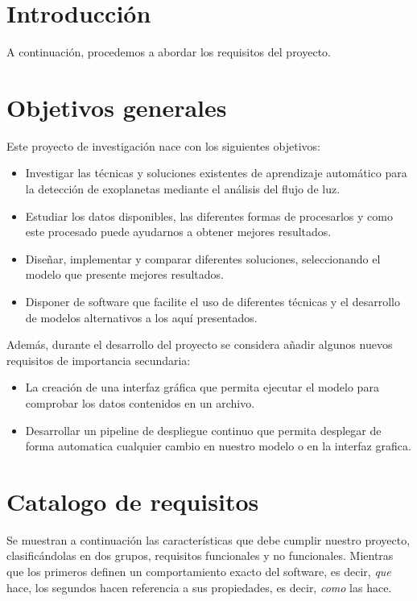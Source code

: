 
\section{Introducción}

A continuación, procedemos a abordar los requisitos del proyecto.

\section{Objetivos generales}

Este proyecto de investigación nace con los siguientes objetivos:

\begin{itemize}
    \item Investigar las técnicas y soluciones existentes de aprendizaje automático para la detección de exoplanetas mediante el análisis del flujo de luz.    
    \item Estudiar los datos disponibles, las diferentes formas de procesarlos y como este procesado puede ayudarnos a obtener mejores resultados.
    \item Diseñar, implementar y comparar diferentes soluciones, seleccionando el modelo que presente mejores resultados.
    \item Disponer de software que facilite el uso de diferentes técnicas y el desarrollo de modelos alternativos a los aquí presentados.
\end{itemize}

Además, durante el desarrollo del proyecto se considera añadir algunos nuevos requisitos de importancia secundaria:

\begin{itemize}    
    \item La creación de una interfaz gráfica que permita ejecutar el modelo para comprobar los datos contenidos en un archivo.
    \item Desarrollar un pipeline de despliegue continuo que permita desplegar de forma automatica cualquier cambio en nuestro modelo o en la interfaz grafica.
\end{itemize}

\section{Catalogo de requisitos}

Se muestran a continuación las características que debe cumplir nuestro proyecto, clasificándolas en dos grupos, requisitos funcionales y no funcionales. Mientras que los primeros definen un comportamiento exacto del software, es decir, \textit{que} hace, los segundos hacen referencia a sus propiedades, es decir, \textit{como} las hace.

